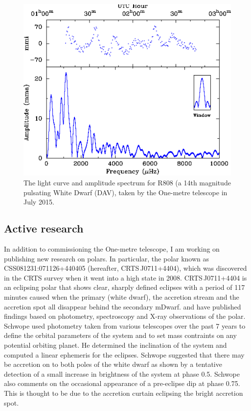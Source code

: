 \documentclass[a4paper,fleqn,usenatbib]{mnras}
\begin{document}
\begin{figure}
	\includegraphics[width=\columnwidth]{images/r808.pdf}
    \caption{The light curve and amplitude spectrum for R808 (a 14th magnitude pulsating White Dwarf (DAV), taken by the One-metre telescope in July 2015.}
    \label{fig:r808}
\end{figure}
 
\subsection{Active research}
In addition to commissioning the One-metre telescope, I am working on publishing new research on polars. In particular, the polar known as CSS081231:071126+440405 (hereafter,  CRTS\,J0711+4404), which was discovered in the CRTS survey when it went into a high state in 2008.  CRTS\,J0711+4404 is an eclipsing polar that shows  clear, sharply defined eclipses  with a period of 117 minutes caused when the primary (white dwarf), the accretion stream and the accretion spot all disappear behind the secondary mDwarf.  \citet{Schwope2015} and \citet{Worpel2015} have published findings based on photometry, spectroscopy and X-ray observations of the polar. Schwope used photometry taken from various telescopes over the past 7 years to define the orbital parameters of the system and to set mass contraints on any potential orbiting planet. He determined the inclination of the system and computed a linear ephemeris for the eclipses. Schwope suggested that there may be accretion on to both poles of the white dwarf as shown by a tentative detection of a small increase in brightness of the system at phase 0.5. Schwope also comments on the occasional appearance of a pre-eclipse dip at phase 0.75. This is thought to be due to the accretion curtain eclipsing the bright accretion spot.  
\end{document}
